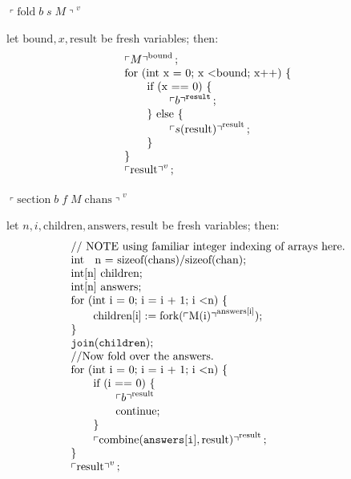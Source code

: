 \documentclass{article}
\newcommand{\q}[1]{\ensuremath{\left\ulcorner #1\right\urcorner}}
\begin{document}
\paragraph{$\q{\mathrm{fold} \; b \; s \; M}^v$  }
let $\mathrm{bound}, x, \mathrm{result}$ be fresh variables; then:
\[\begin{array}{l}
\q{M}^\mathrm{bound}; \\
\text{for (int x = 0; x \textless bound; x++) \{} \\
 \qquad \text{if (x == 0) \{} \\
   \qquad\qquad \q{b}^\mathtt{result}; \\
 \qquad \text{\} else \{} \\
   \qquad\qquad \q{s(\mathrm{result})}^\mathrm{result}; \\
 \qquad \text{\}} \\
\text{\}} \\
\q{\mathrm{result}}^v; \\
\end{array}\]

\paragraph{$\q{\mathrm{section} \; b \; f \; M \; \mathrm{chans}}^v$  }
let $n, i, \mathrm{children}, \mathrm{answers}, \mathrm{result}$ be fresh variables; then:
\[\begin{array}{l}
  \text{// NOTE using familiar integer indexing of arrays here.} \\
  \text{int \; n = sizeof(chans)/sizeof(chan);} \\
  \text{int[n] children;} \\
  \text{int[n] answers;} \\
  \text{for (int i = 0; i = i + 1; i \textless n) \{} \\
    \qquad \mathrm{children[i] := fork(\q{M(i)}^{answers[i]});} \\
  \text{\}} \\
  \mathtt{join(children);} \\
  \text{//Now fold over the answers.} \\
  \text{for (int i = 0; i = i + 1; i \textless n) \{} \\
    \qquad\text{if (i == 0) \{} \\
    \qquad\qquad\q{b}^\mathrm{result} \\
    \qquad\qquad\mathrm{continue;} \\
    \qquad\text{\}} \\
    \qquad \q{\mathrm{combine}(\mathtt{answers[i]},
    \mathrm{result})}^\mathrm{result}; \\
  \text{\}} \\
  \q{\mathrm{result}}^v;
\end{array}\]
\end{document}

